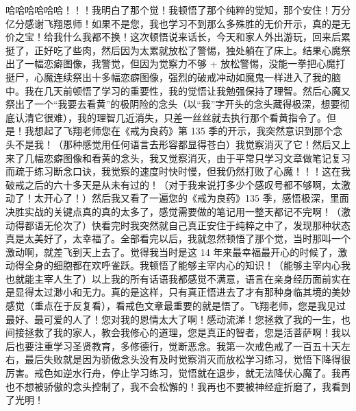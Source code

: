 \begin{case}
    哈哈哈哈哈哈！！！我明白了那个觉！我顿悟了那个纯粹的觉知，那个安住！万分亿分感谢飞翔恩师！如果不是您，我也学习不到那么多殊胜的无价开示，真的是无价之宝！给我什么我都不换！这次顿悟说来话长，今天和家人外出游玩，回来后累挺了，正好吃了些肉，然后因为太累就放松了警惕，独处躺在了床上。结果心魔祭出了一幅恋癖图像，我警觉，但因为觉察力不够 + 放松警惕，没能一拳把心魔打挺尸，心魔连续祭出十多幅恋癖图像，强烈的破戒冲动如魔鬼一样进入了我的脑中。我在几天前顿悟了学习的重要性，我的觉悟让我勉强保持了理智。然后心魔又祭出了一个“我要去看黄”的极阴险的念头（以“我”字开头的念头藏得极深，想要彻底认清它很难），我的理智几近消失，只差一丝丝就去执行那个看黄指令了。但是！我想起了飞翔老师您在《戒为良药》第 135 季的开示，我突然意识到那个念头不是我！（那种感觉用任何语言去形容都显得苍白）我觉察消灭了它！然后又上来了几幅恋癖图像和看黄的念头，我又觉察消灭，由于平常只学习文章做笔记复习而疏于练习断念口诀，我觉察的速度时快时慢，但我仍然打败了心魔！！！这在我破戒之后的六十多天是从未有过的！（对于我来说打多少个感叹号都不够啊，太激动了！太开心了！）然后我又看了一遍您的《戒为良药》135 季，感悟极深，里面决胜实战的关键点真的真的太多了，感觉需要做的笔记用一整天都记不完啊！（激动得都语无伦次了）快看完时我突然就自己真正安住于纯粹之中了，发现那种状态真是太美好了，太幸福了。全部看完以后，我就忽然顿悟了那个觉，当时那叫一个激动啊，就差飞到天上去了。觉得我当时是这 14 年来最幸福最开心的时候了，激动得全身的细胞都在欢呼雀跃。我顿悟了能够主宰内心的知识！（能够主宰内心我也就能主宰人生了）以上我的所有话语我都感觉不满意，语言在亲身经历面前实在是显得太过渺小和无力。真的是这样，只有真正悟进去了才有那种身临其境的美妙感觉（重点在于反复看），看戒色文章最重要的就是悟了。飞翔老师，您是我见过最好、最可爱的人了！您对我的恩情太大了啊！感动流涕！您拯救了我的一生，也间接拯救了我的家人，教会我修心的道理，您是真正的智者，您是活菩萨啊！我以后也要注重学习圣贤教育，多修德行，觉断恶念。我第一次戒色戒了一百五十天左右，最后失败就是因为骄傲念头没有及时觉察消灭而放松学习练习，觉悟下降得很厉害。戒色如逆水行舟，停止学习练习，觉悟就在退步，就无法降伏心魔了。我再也不想被骄傲的念头控制了，我不会松懈的！我再也不要被神经症折磨了，我看到了光明！

\end{case}
